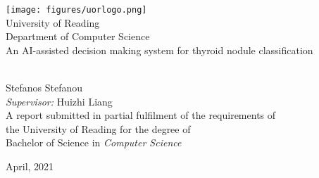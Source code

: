 \documentclass[a4paper,11pt,oneside]{book}
\begin{document}
    
    \frontmatter
          
    \begin{titlepage}      
        \begin{center}
            \texttt{[image: figures/uorlogo.png]}\\[0.5cm]
            {\LARGE University of Reading\\[0.5cm]
                Department of Computer Science}\\[2cm]
            
            
            \linespread{1.2}\huge {An AI-assisted decision making system for thyroid nodule classification}
            
            
            \linespread{1}~\\[2cm]
            
            {\Large Stefanos Stefanou}\\[1cm] 
            
            {\large \emph{Supervisor:} Huizhi Liang}\\[1cm] %
            
            \large A report submitted in partial fulfilment of the requirements of\\the University of Reading for the degree of\\ Bachelor of Science in \textit{Computer Science}\\[0.3cm] 
            \vfill
            
            
            April, 2021%
        \end{center}
    \end{titlepage}
\end{document}
